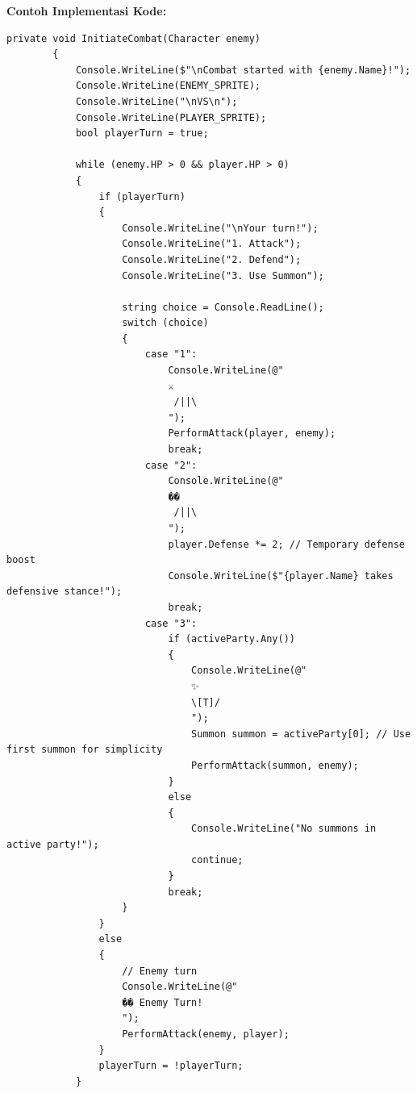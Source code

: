 \documentclass[12pt]{article}
\begin{document}
\textbf{Contoh Implementasi Kode:}
\begin{lstlisting}[language=CSharp, caption=Contoh Implementasi Combat System dengan Attack]
private void InitiateCombat(Character enemy)
        {
            Console.WriteLine($"\nCombat started with {enemy.Name}!");
            Console.WriteLine(ENEMY_SPRITE);
            Console.WriteLine("\nVS\n");
            Console.WriteLine(PLAYER_SPRITE);
            bool playerTurn = true;

            while (enemy.HP > 0 && player.HP > 0)
            {
                if (playerTurn)
                {
                    Console.WriteLine("\nYour turn!");
                    Console.WriteLine("1. Attack");
                    Console.WriteLine("2. Defend");
                    Console.WriteLine("3. Use Summon");

                    string choice = Console.ReadLine();
                    switch (choice)
                    {
                        case "1":
                            Console.WriteLine(@"
                            ⚔️
                             /||\ 
                            ");
                            PerformAttack(player, enemy);
                            break;
                        case "2":
                            Console.WriteLine(@"
                            ��️
                             /||\ 
                            ");
                            player.Defense *= 2; // Temporary defense boost
                            Console.WriteLine($"{player.Name} takes defensive stance!");
                            break;
                        case "3":
                            if (activeParty.Any())
                            {
                                Console.WriteLine(@"
                                ✨
                                \[T]/
                                ");
                                Summon summon = activeParty[0]; // Use first summon for simplicity
                                PerformAttack(summon, enemy);
                            }
                            else
                            {
                                Console.WriteLine("No summons in active party!");
                                continue;
                            }
                            break;
                    }
                }
                else
                {
                    // Enemy turn
                    Console.WriteLine(@"
                    �� Enemy Turn!
                    ");
                    PerformAttack(enemy, player);
                }
                playerTurn = !playerTurn;
            }


\end{lstlisting}
\end{document}
